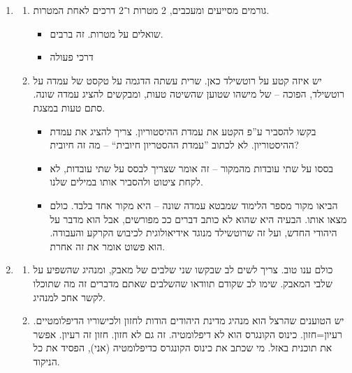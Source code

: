 \documentclass[]{../../../../tex/classes/styledArticle}
\begin{document}
\begin{enumerate}
		המורה אמרה מאוד בזהירות (עניין אידבדואלי) – סטטיסטית, מי שענה על שאלה 3, ירדו לו פחות נקודות. מצד שני, יש ילדים שיבחרו את שאלה 1, שהייתה מצוינת בשבילם, למרות שסטטיסטית ירדו הכי הרבה נקודות בה. 
		\item \begin{enumerate}[A']
			\item גורמים מסייעים ומעכבים, 2 מטרות ו־2 דרכים לאחת המטרות. \begin{itemize}
				\item שואלים על מטרות. זה ברבים. 
				\item דרכי פעולה 
			\end{itemize}
			\item יש איזה קטע על רוטשילד כאן. שרית עשתה הדגמה על טקסט של עמדה על רוטשילד, הפוכה – של מישהו שטוען שהשיטה טעות, ומבקשים להציג עמדה שונה. סתם טעות במצגת. 
			\begin{itemize}
				\item בקשו להסביר ע''פ הקטע את עמדת ההיסטוריון. צריך להציג את עמדת ההיסטוריון. לא לכתוב ''עמדת ההסטריון חיובית`` – מה זה חיובית? 
				\item בססו על שתי עובדות מהמקור – זה אומר שצריך לבסס על שתי עובדות, לא לקחת ציטוט ולהסביר אותו במילים שלנו. 
				\item הביאו מקור מספר הלימוד שמבטא עמדה שונה – היא מקור אחד בלבד. כולם מצאו אותו. הבעיה היא שהוא לא כותב דברים ככ מפורשים, אבל הוא מדבר על היהודי החדש, ועל זה שרוטשילד מנוגד אידיאולוגית לכיבוש הקרקע והעבודה. הוא פשוט אומר את זה אחרת. 
			\end{itemize}
		\end{enumerate}
		
		\item \begin{enumerate}[A']
			\item כולם ענו טוב. צריך לשים לב שבקשו שני שלבים של מאבק, ומנהיג שהשפיע על שלבי המאבק. שימו לב שקודם תוודאו שהשלבים שאתם מדברים זה מה שתוכלו לקשר אחכ למנהיג. 
			\item יש הטוענים שהרצל הוא מנהיג מדינת היהודים הודות לחזון ולכישוריו הדיפלומטיים. רעיון=חזון. כינוס הקונגרס הוא לא דיפלומטיה. זה גם לא חזון. חזון זה רעיון. אפשר את תוכנית באזל. מי שכתב את כינוס הקונגרס כדיפלומטיה (אני), הפסיד את כל הניקוד. 
		\end{enumerate}
		

\end{enumerate}
\end{document}
